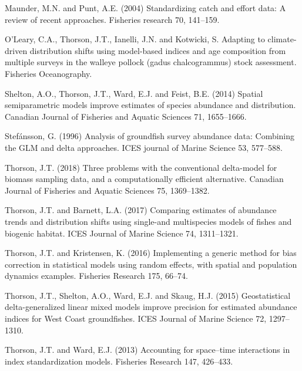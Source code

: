 \documentclass[
  11pt,
]{article}
\begin{document}
Maunder, M.N. and Punt, A.E. (2004) Standardizing catch and effort data: A review of recent approaches. Fisheries research 70, 141--159.

O'Leary, C.A., Thorson, J.T., Ianelli, J.N. and Kotwicki, S. Adapting to climate-driven distribution shifts using model-based indices and age composition from multiple surveys in the walleye pollock (gadus chalcogrammus) stock assessment. Fisheries Oceanography.

Shelton, A.O., Thorson, J.T., Ward, E.J. and Feist, B.E. (2014) Spatial semiparametric models improve estimates of species abundance and distribution. Canadian Journal of Fisheries and Aquatic Sciences 71, 1655--1666.

Stefánsson, G. (1996) Analysis of groundfish survey abundance data: Combining the GLM and delta approaches. ICES journal of Marine Science 53, 577--588.

Thorson, J.T. (2018) Three problems with the conventional delta-model for biomass sampling data, and a computationally efficient alternative. Canadian Journal of Fisheries and Aquatic Sciences 75, 1369--1382.

Thorson, J.T. and Barnett, L.A. (2017) Comparing estimates of abundance trends and distribution shifts using single-and multispecies models of fishes and biogenic habitat. ICES Journal of Marine Science 74, 1311--1321.

Thorson, J.T. and Kristensen, K. (2016) Implementing a generic method for bias correction in statistical models using random effects, with spatial and population dynamics examples. Fisheries Research 175, 66--74.

Thorson, J.T., Shelton, A.O., Ward, E.J. and Skaug, H.J. (2015) Geostatistical delta-generalized linear mixed models improve precision for estimated abundance indices for West Coast groundfishes. ICES Journal of Marine Science 72, 1297--1310.

Thorson, J.T. and Ward, E.J. (2013) Accounting for space--time interactions in index standardization models. Fisheries Research 147, 426--433.
\end{document}
